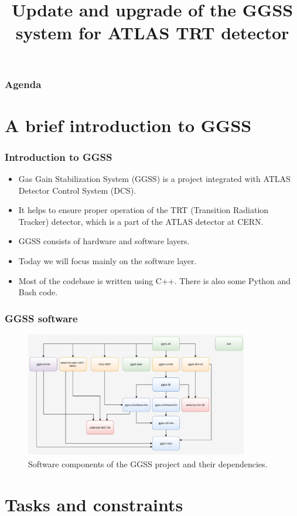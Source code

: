 \documentclass[10pt]{beamer}
\title{Update and upgrade of the GGSS system for ATLAS TRT detector}
\author{\normalsize{Arkadiusz Kasprzak \newline \and 
    Jarosław Cierpich \newline \newline \and 
    Supervisor: Bartosz Mindur}}
\date{}
\begin{document}
\titleframe[en]

\begin{frame}
\frametitle{Agenda}
\tableofcontents
\end{frame}


\section {A brief introduction to GGSS}


\begin{frame}
\frametitle{Introduction to GGSS}
\begin{itemize}
\item Gas Gain Stabilization System (GGSS) is a project integrated with ATLAS Detector Control System (DCS).
\item It helps to ensure proper operation of the TRT (Transition Radiation Tracker) detector, which is a part of the ATLAS detector at CERN.
\item GGSS consists of hardware and software layers.
\item Today we will focus mainly on the software layer.
\item Most of the codebase is written using C++. There is also some Python and Bash code. 
\end{itemize}
\end{frame}

\begin{frame}
\frametitle{GGSS software}
\begin{figure}
    \centering
    \includegraphics[width=0.87\textwidth]{resources/ggss_software_arch.png}
    \caption{Software components of the GGSS project and their dependencies.}
\end{figure}
\end{frame}


\section {Tasks and constraints}
\end{document}
